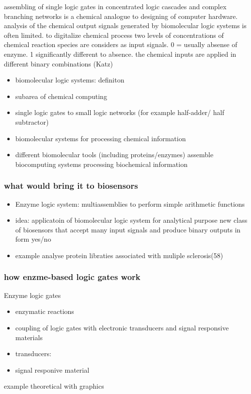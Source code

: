 \documentclass[runningheads]{llncs}
\begin{document}
	assembling of single logic gates in concentrated logic cascades and complex branching networks is a chemical analogue to designing of computer hardware. analysis of the chemical output signals generated by biomolecular logic systems is often limited.
	to digitalize chemical process two levels of concentrations of chemical reaction species are considers as input signals. 0 = usually absense of enzyme. 1 significantly different to absence. the chemical inputs are applied in different binary combinations (Katz)
		\begin{itemize}
			\item biomolecular logic systems: definiton
			\item subarea of chemical computing 
			\item single logic gates to small logic networks (for example half-adder/ half subtractor)
			\item biomolecular systems for processing chemical information
			\item different biomolecular tools (including proteins/enzymes) assemble biocomputing systems processing biochemical information \\	
		\end{itemize}
	\subsubsection{what would bring it to biosensors}	
	\begin{itemize}	
		\item Enzyme logic system: multiassemblies to perform simple arithmetic functions
		\item idea: applicatoin of biomolecular logic system for analytical purpose new class of biosensors that accept many input signals and produce binary outputs in form yes/no 
		\item example analyse protein libraties associated with muliple sclerosis(58)
	\end{itemize}

	\subsubsection{how enzme-based logic gates work}	
Enzyme logic gates
\begin{itemize}
	\item enzymatic reactions
	\item coupling of logic gates with electronic transducers and signal responsive materials
	\item transducers:
	\item signal responive material
	
\end{itemize}
example theoretical with graphics
\end{document}
